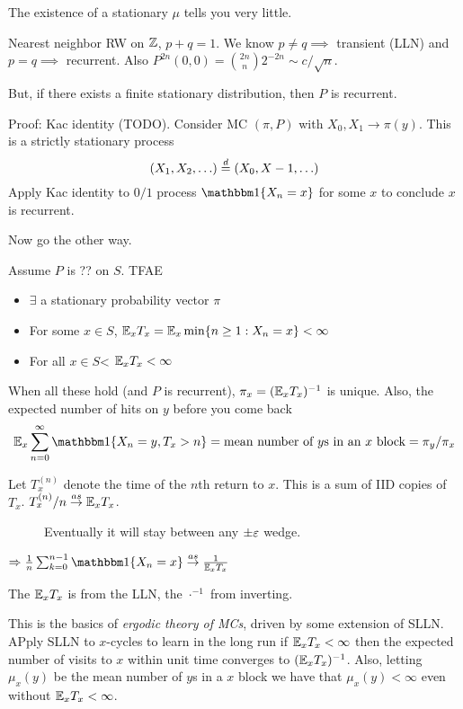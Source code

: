 The existence of a stationary $\mu$ tells you very little.

\begin{example}
  Nearest neighbor RW on $\mathbb{Z}$, $p + q = 1$.
  We know $p \neq q \implies$ transient (LLN) and $p=q \implies$ recurrent.
  Also $P^{2n}(0,0) = \binom{2n}{n} 2^{-2n} \sim c / \sqrt{n}$.

  But, if there exists a finite stationary distribution, then $P$ is recurrent.

  Proof: Kac identity (TODO).
  Consider MC $(\pi, P)$ with $X_0, X_1 \to \pi(y)$. This is a strictly stationary
  process
  \[
    (X_1, X_2, \ldots) \overset{d}{=} (X_0, X-1, \ldots)
  \]
  Apply Kac identity to $0/1$ process $\ind\{X_n = x\}$ for some $x$ to conclude $x$ is recurrent.
\end{example}

Now go the other way.
\begin{theorem}
  Assume $P$ is ?? on $S$. TFAE
  \begin{itemize}
    \item $\exists$ a stationary probability vector $\pi$
    \item For some $x \in S$, $\mathbb{E}_x T_x = \mathbb{E}_x \min\{n \geq 1 : X_n = x\} < \infty$
    \item For all $x \in S$< $\mathbb{E}_x T_x < \infty$
  \end{itemize}
  When all these hold (and $P$ is recurrent), $\pi_x = (\mathbb{E}_x T_x)^{-1}$ is unique.
  Also, the expected number of hits on $y$ before you come back
  \[
    \bE_x \sum_{n=0}^\infty \ind\{X_n = y, T_x > n\}
    = \text{mean number of $y$s in an $x$ block}
    = \pi_y / \pi_x
  \]
\end{theorem}

Let $T_x^{(n)}$ denote the time of the $n$th return to $x$. This is a sum
of IID copies of $T_x$. $T_x^{(n)} / n \overset{as}{\to} \mathbb{E}_x T_x$.
\begin{figure}[ht]
    \centering
    \caption{Eventually it will stay between any $\pm \varepsilon$ wedge.}
    \label{fig:as-in-wedge}
\end{figure}
$\implies \frac{1}{n} \sum_{k=0}^{n-1} \ind\{X_n = x\} \asto \frac{1}{\bE_x T_x}$

The $\mathbb{E}_x T_x$ is from the LLN, the $\cdot^{-1}$  from inverting.

This is the basics of \emph{ergodic theory of MCs}, driven by some extension of SLLN.
APply SLLN to $x$-cycles to learn in the long run if $\mathbb{E}_x T_x < \infty$ then
the expected number of visits to $x$ within unit time converges to $(\mathbb{E}_x T_x)^{-1}$.
Also, letting $\mu_x(y)$ be the mean number of $y$s in a $x$ block we have
that $\mu_x(y) < \infty$ even without $\mathbb{E}_x T_x < \infty$.

